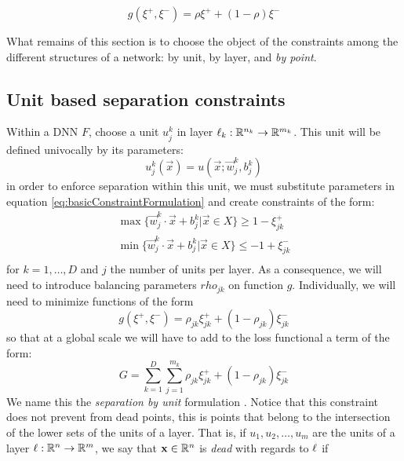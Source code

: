 \begin{equation}\label{eq:definitionOfRho}
    g(\xi^{+},\xi^{-}) = \rho\xi^{+}+(1-\rho)\xi^{-}
\end{equation}

What remains of this section is to choose the object of the constraints among the different structures of a network: by unit, by layer, and \emph{by point}.

\subsection{Unit based separation constraints \SepUnit}\label{subsec:sepUnit}
Within a \ReLU DNN $F$, choose a unit $u_j^k$ in layer $\ell_k:\mathbb{R}^{n_k}\rightarrow\mathbb{R}^{m_k}$. This unit will be defined univocally by its parameters:
\begin{equation}\label{eq:unitSepParameterWriting}
    u^k_j(\vec{x}) = u(\vec{x};\vec{w}^k_j,b^k_j)
\end{equation}
in order to enforce separation within this unit, we must substitute parameters in equation \ref{eq:basicConstraintFormulation} and create constraints of the form:
\begin{equation}
    \begin{array}{lcl}
    \max\{\vec{w}^k_j\cdot\vec{x}+b^k_j|\vec{x}\in X\}\geq 1-\xi^{+}_{jk}\\
    \min\{\vec{w}^k_j\cdot\vec{x}+b^k_j|\vec{x}\in X\}\leq -1+\xi^{-}_{jk}\\
\end{array}
\end{equation}
for $k=1,\ldots,D$ and $j$ the number of units per layer. As a consequence, we will need to introduce balancing parameters $rho_{jk}$ on function $g$. Individually, we will need to minimize functions of the form
\begin{equation}
    g(\xi^{+},\xi^{-}) = \rho_{jk}\xi^{+}_{jk}+(1-\rho_{jk})\xi^{-}_{jk}
\end{equation}
so that at a global scale we will have to add to the loss functional a term of the form:
\begin{equation}\label{eq:constraintLossForUnitSeparation}
    G = \sum_{k=1}^{D}\sum_{j=1}^{m_k}\rho_{jk}\xi^{+}_{jk}+(1-\rho_{jk})\xi^{-}_{jk}
\end{equation}
We name this the \emph{separation by unit} formulation \SepUnit. Notice that this constraint does not prevent from dead points, this is points that belong to the intersection of the lower sets of the units of a layer. That is, if $u_1,u_2,\ldots,u_m$ are the units of a layer $\ell:\mathbb{R}^{n}\rightarrow\mathbb{R}^{m}$, we say that $\mathbf{x}\in\mathbb{R}^{n}$ is \emph{dead} with regards to $\ell$  if

